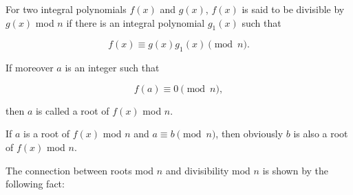 For two integral polynomials $f(x)$ and $g(x)$, $f(x)$ is said to be divisible by $g(x)$ mod $n$ if there is an integral polynomial $g_1(x)$ such that

$$f(x) \equiv g(x)g_1(x) \pmod{n}.$$

If moreover $a$ is an integer such that

$$f(a) \equiv 0 \pmod{n},$$

then $a$ is called a root of $f(x)$ mod $n$.

If $a$ is a root of $f(x)$ mod $n$ and $a \equiv b \pmod{n}$, then obviously $b$ is also a root of $f(x)$ mod $n$.

The connection between roots mod $n$ and divisibility mod $n$ is shown by the following fact:
